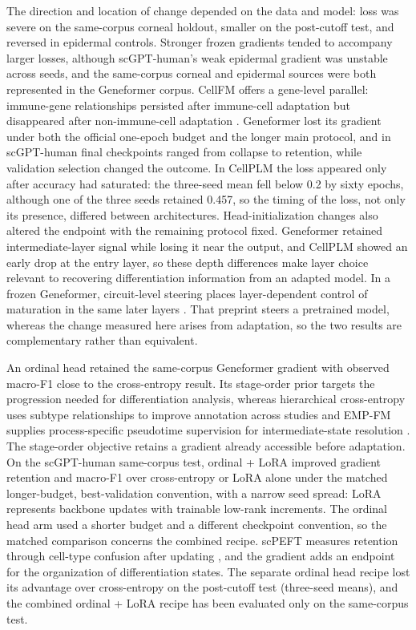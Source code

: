\documentclass[12pt,letterpaper]{article}
\begin{document}
The direction and location of change depended on the data and model: loss was severe on the same-corpus corneal holdout, smaller on the post-cutoff test, and reversed in epidermal controls. Stronger frozen gradients tended to accompany larger losses, although scGPT-human's weak epidermal gradient was unstable across seeds, and the same-corpus corneal and epidermal sources were both represented in the Geneformer corpus. CellFM offers a gene-level parallel: immune-gene relationships persisted after immune-cell adaptation but disappeared after non-immune-cell adaptation \cite{zeng2025cellfm}. Geneformer lost its gradient under both the official one-epoch budget and the longer main protocol, and in scGPT-human final checkpoints ranged from collapse to retention, while validation selection changed the outcome. In CellPLM the loss appeared only after accuracy had saturated: the three-seed mean fell below 0.2 by sixty epochs, although one of the three seeds retained 0.457, so the timing of the loss, not only its presence, differed between architectures. Head-initialization changes also altered the endpoint with the remaining protocol fixed. Geneformer retained intermediate-layer signal while losing it near the output, and CellPLM showed an early drop at the entry layer, so these depth differences make layer choice relevant to recovering differentiation information from an adapted model. In a frozen Geneformer, circuit-level steering places layer-dependent control of maturation in the same later layers \cite{kendiukhov2026circuits}. That preprint steers a pretrained model, whereas the change measured here arises from adaptation, so the two results are complementary rather than equivalent.

An ordinal head retained the same-corpus Geneformer gradient with observed macro-F1 close to the cross-entropy result. Its stage-order prior targets the progression needed for differentiation analysis, whereas hierarchical cross-entropy uses subtype relationships to improve annotation across studies \cite{hce2026} and EMP-FM supplies process-specific pseudotime supervision for intermediate-state resolution \cite{pan2024}. The stage-order objective retains a gradient already accessible before adaptation. On the scGPT-human same-corpus test, ordinal + LoRA improved gradient retention and macro-F1 over cross-entropy or LoRA alone under the matched longer-budget, best-validation convention, with a narrow seed spread: LoRA represents backbone updates with trainable low-rank increments. The ordinal head arm used a shorter budget and a different checkpoint convention, so the matched comparison concerns the combined recipe. scPEFT measures retention through cell-type confusion after updating \cite{he2026scpeft}, and the gradient adds an endpoint for the organization of differentiation states. The separate ordinal head recipe lost its advantage over cross-entropy on the post-cutoff test (three-seed means), and the combined ordinal + LoRA recipe has been evaluated only on the same-corpus test.
\end{document}

